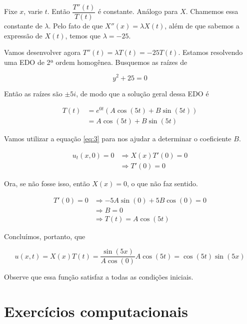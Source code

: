 \documentclass{article}
\begin{document}
\begin{enumerate}
                Fixe $x$, varie $t$. Então $\dfrac{T''(t)}{T(t)}$ é constante.
                Análogo para $X$. Chamemos essa constante de $\lambda$.
                Pelo fato de que $X''(x) = \lambda X(t)$, além de que sabemos a expressão de $X(t)$,
                temos que $\lambda = -25$.

                Vamos desenvolver agora $T''(t) = \lambda T(t) = -25 T(t)$.
                Estamos resolvendo uma EDO de 2ª ordem homogênea. Busquemos as raízes de

                $$y^2+25 = 0$$

                Então as raízes são $\pm 5i$, de modo que a solução geral dessa EDO é

                \begin{align*}
                    T(t) &= e^{0t} (A \cos(5t) + B\sin(5t)) \\
                    &= A \cos(5t) + B\sin(5t)
                \end{align*}

                Vamos utilizar a equação \ref{eq:3} para nos ajudar a determinar o coeficiente $B$.
                
                \begin{align*}
                    u_t(x, 0) = 0 &\Rightarrow X(x) T'(0) = 0 \\
                    &\Rightarrow T'(0) = 0
                \end{align*}

                Ora, se não fosse isso, então $X(x) = 0$, o que não faz sentido.

                \begin{align*}
                    T'(0) = 0 &\Rightarrow -5A \sin(0) + 5B\cos(0) = 0 \\
                    &\Rightarrow B = 0 \\
                    &\Rightarrow T(t) = A \cos(5t)
                \end{align*}

                Concluímos, portanto, que

                $$u(x, t) = X(x)T(t) = \dfrac{\sin(5x)}{A \cos(0)}A \cos(5t) = \cos(5t)\sin(5x)$$

                Observe que essa função satisfaz a todas as condições iniciais.
        \end{enumerate}

    \section*{Exercícios computacionais}
\end{document}
